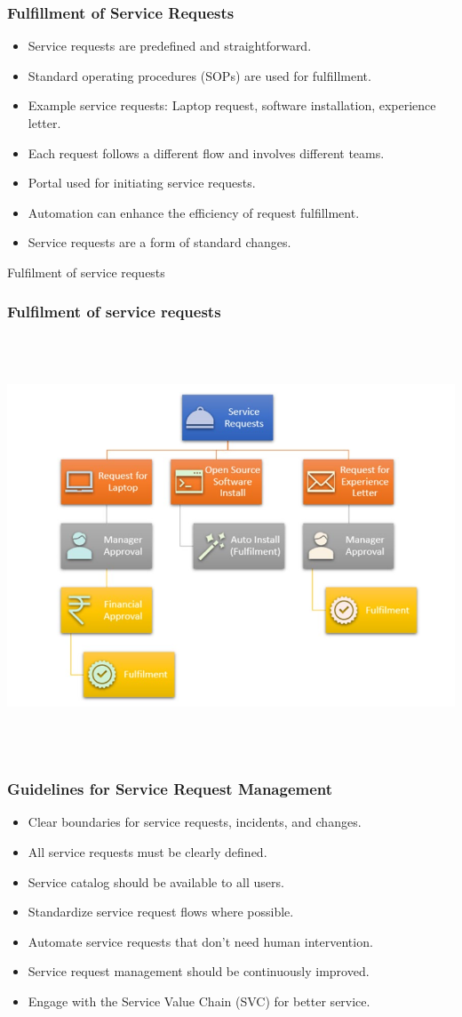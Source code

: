\documentclass[aspectratio=169, table]{beamer}
\begin{document}
\begin{frame}
	\frametitle{Fulfillment of Service Requests}
	\begin{itemize}
		\item Service requests are predefined and straightforward.
		\item Standard operating procedures (SOPs) are used for fulfillment.
		\item Example service requests: Laptop request, software installation, experience letter.
		\item Each request follows a different flow and involves different teams.
		\item Portal used for initiating service requests.
		\item Automation can enhance the efficiency of request fulfillment.
		\item Service requests are a form of standard changes.
	\end{itemize}
\end{frame}

\begin{frame}{Fulfilment of service requests} 	 \frametitle{Fulfilment of service requests} \begin{center} 	\includegraphics[width=0.5\linewidth]{images/image-01.png} \end{center} \end{frame}

\begin{frame}
	\frametitle{Guidelines for Service Request Management}
	\begin{itemize}
		\item Clear boundaries for service requests, incidents, and changes.
		\item All service requests must be clearly defined.
		\item Service catalog should be available to all users.
		\item Standardize service request flows where possible.
		\item Automate service requests that don't need human intervention.
		\item Service request management should be continuously improved.
		\item Engage with the Service Value Chain (SVC) for better service.
	\end{itemize}
\end{frame}
\end{document}

